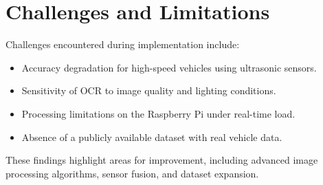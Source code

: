 \section{Challenges and Limitations}
Challenges encountered during implementation include:
\begin{itemize}
    \item Accuracy degradation for high-speed vehicles using ultrasonic sensors.
    \item Sensitivity of OCR to image quality and lighting conditions.
    \item Processing limitations on the Raspberry Pi under real-time load.
    \item Absence of a publicly available dataset with real vehicle data.
\end{itemize}

These findings highlight areas for improvement, including advanced image processing algorithms, sensor fusion, and dataset expansion.
